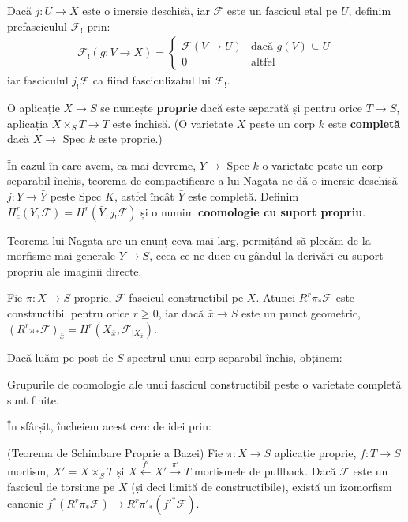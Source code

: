 \documentclass[13pt,openany]{book}
\begin{document}
Dacă $j :U \rightarrow X$ este o imersie deschisă, iar $\mathcal{F}$ este un fascicul etal pe $U$, definim prefasciculul $\mathcal{F}_!$ prin:
\begin{align*}
\mathcal{F}_!(g: V \rightarrow X) = \left\{
     \begin{array}{lr}
       \mathcal{F}(V \rightarrow U) & \text{dacă } g(V)\subseteq U\\
       0 & \text{altfel}
     \end{array}
   \right.
\end{align*}
iar fasciculul $j_!\mathcal{F}$ ca fiind fasciculizatul lui $\mathcal{F}_!$.

O aplicație $X \rightarrow S$ se numește {\bf proprie} dacă este separată și pentru orice $T \rightarrow S$, aplicația $X \times_S T \rightarrow T$ este închisă. (O varietate $X$ peste un corp $k$ este {\bf completă} dacă $X \rightarrow$ Spec $k$ este proprie.)

În cazul în care avem, ca mai devreme, $Y \rightarrow$ Spec $k$ o varietate peste un corp separabil închis, teorema de compactificare a lui Nagata ne dă o imersie deschisă $j: Y \rightarrow \bar{Y}$ peste Spec $K$, astfel încât $\bar{Y}$ este completă. Definim $H^r_c(Y,\mathcal{F}) = H^r(\bar{Y},j_!\mathcal{F})$ și o numim {\bf coomologie cu suport propriu}.

Teorema lui Nagata are un enunț ceva mai larg, permițând să plecăm de la morfisme mai generale $Y \rightarrow S$, ceea ce ne duce cu gândul la derivări cu suport propriu ale imaginii directe.

\begin{teo}
Fie $\pi: X \rightarrow S$ proprie, $\mathcal{F}$ fascicul constructibil pe $X$. Atunci $R^r\pi_*\mathcal{F}$ este constructibil pentru orice $r \geq 0$, iar dacă $\bar{x} \rightarrow S$ este un punct geometric, $(R^r\pi_*\mathcal{F})_{\bar{x}} = H^r(X_{\bar{x}},\mathcal{F}_{\mid X_{\bar{x}}})$.
\end{teo}

Dacă luăm pe post de $S$ spectrul unui corp separabil închis, obținem:

\begin{cor}
Grupurile de coomologie ale unui fascicul constructibil peste o varietate completă sunt finite.
\end{cor}

În sfârșit, încheiem acest cerc de idei prin:

\begin{teo}
(Teorema de Schimbare Proprie a Bazei) Fie $\pi: X \rightarrow S$ aplicație proprie, $f: T \rightarrow S$ morfism, $X' = X \times_S T$ și $X\xleftarrow{f'}X'\xrightarrow{\pi'}T$ morfismele de pullback. Dacă $\mathcal{F}$ este un fascicul de torsiune pe $X$ (și deci limită de constructibile), există un izomorfism canonic $f^*(R^r\pi_*\mathcal{F}) \rightarrow R^r\pi'_*(f'^*\mathcal{F})$.
\end{teo}
\end{document}

